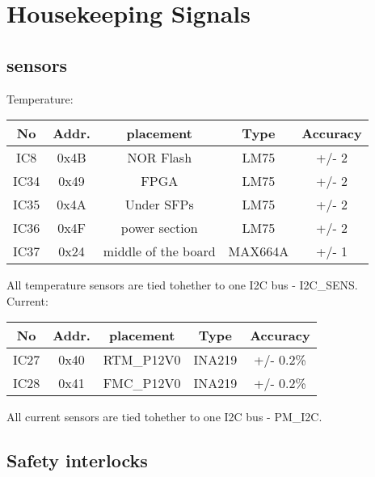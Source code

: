 \section{Housekeeping Signals}
\subsection{sensors}
Temperature:\\
\begin{longtable}{|c|c|c|c|c|}\hline
	No & Addr. & placement & Type & Accuracy \\ \hline
	IC8 & 0x4B & NOR Flash & LM75 & +/- 2 \\ \hline
	IC34 & 0x49 & FPGA & LM75 & +/- 2  \\ \hline
	IC35 & 0x4A & Under SFPs & LM75 & +/- 2  \\ \hline	
	IC36 & 0x4F & power section & LM75 & +/- 2  \\ \hline
	IC37 & 0x24 & middle of the board & MAX664A & +/- 1 \\ \hline
\end{longtable}

All temperature sensors are tied tohether to one I2C bus - I2C\_SENS. \\


Current:
\begin{longtable}{|c|c|c|c|c|}\hline
		No & Addr. & placement & Type & Accuracy \\ \hline
		IC27 & 0x40 &RTM\_P12V0& INA219 & +/- 0.2\% \\ \hline
		IC28 & 0x41 &FMC\_P12V0& INA219 & +/- 0.2\% \\ \hline
\end{longtable}


All current sensors are tied tohether to one I2C bus - PM\_I2C. \\

\subsection{Safety interlocks}

